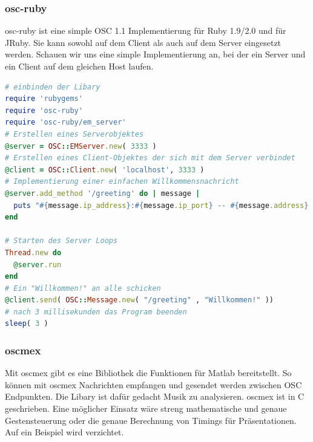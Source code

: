 \documentclass[a4paper, 12pt]{article}
\begin{document}
\subsubsection{osc-ruby}
osc-ruby ist eine simple OSC 1.1 Implementierung für Ruby 1.9/2.0 und für JRuby.
Sie kann sowohl auf dem Client als auch auf dem Server eingesetzt werden.
Schauen wir uns eine simple Implementierung an, bei der ein Server und ein Client auf dem gleichen Host laufen.\cite{oscruby}
\newpage
\begin{lstlisting}[language=ruby]
# einbinden der Libary
require 'rubygems'
require 'osc-ruby'
require 'osc-ruby/em_server'
# Erstellen eines Serverobjektes
@server = OSC::EMServer.new( 3333 )
# Erstellen eines Client-Objektes der sich mit dem Server verbindet
@client = OSC::Client.new( 'localhost', 3333 )
# Implementierung einer einfachen Willkommensnachricht
@server.add_method '/greeting' do | message |
  puts "#{message.ip_address}:#{message.ip_port} -- #{message.address} -- #{message.to_a}"
end

# Starten des Server Loops
Thread.new do
  @server.run
end
# Ein "Willkommen!" an alle schicken
@client.send( OSC::Message.new( "/greeting" , "Willkommen!" ))
# nach 3 millisekunden das Program beenden
sleep( 3 )
\end{lstlisting}

\subsubsection{oscmex}
Mit oscmex gibt es eine Bibliothek die Funktionen für Matlab bereitstellt.
So können mit oscmex Nachrichten empfangen und gesendet werden zwischen OSC Endpunkten.
Die Libary ist dafür gedacht Musik zu analysieren. oscmex ist in C geschrieben.
Eine möglicher Einsatz wäre streng mathematische und genaue Gestensteuerung oder die genaue Berechnung von Timings für Präsentationen. Auf ein Beispiel wird verzichtet.\cite{oscmex}
\end{document}
